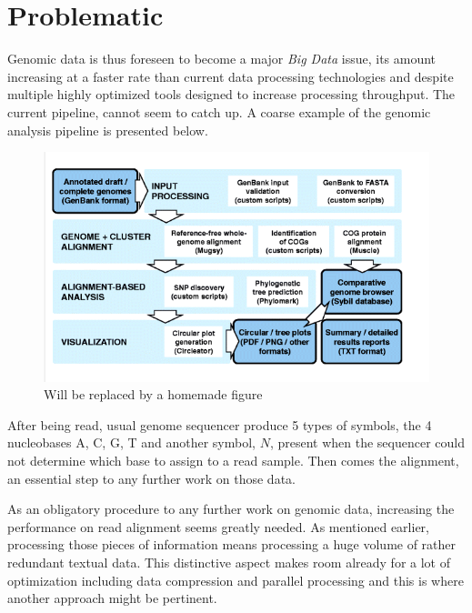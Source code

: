 \section{Problematic}

Genomic data is thus foreseen to become a major \textit{Big Data} issue, its amount increasing at a faster rate than current data processing technologies and despite multiple highly optimized tools designed to increase processing throughput. The current pipeline, cannot seem to catch up. A coarse example of the genomic analysis pipeline is presented below. \\

\begin{minipage}[t]{0.60\textwidth}
\begin{figure}[H]
    \centering
    \includegraphics[scale = 0.4]{Figures/pipeline.png}
    \caption{Will be replaced by a homemade figure}
    \label{fig:analysispipe}
\end{figure}
\end{minipage}
\begin{minipage}[t]{0.350\textwidth}
After being read, usual genome sequencer produce 5 types of symbols, the 4 nucleobases A, C, G, T and another symbol, $N$, present when the sequencer could not determine which base to assign to a read sample. Then comes the alignment, an essential step to any further work on those data. \\

\end{minipage}
\vspace*{5mm}



As an obligatory procedure to any further work on genomic data, increasing the performance on read alignment seems greatly needed. As mentioned earlier, processing those pieces of information means processing a huge volume of rather redundant textual data. This distinctive aspect makes room already for a lot of optimization including data compression and parallel processing and this is where another approach might be pertinent. \\

